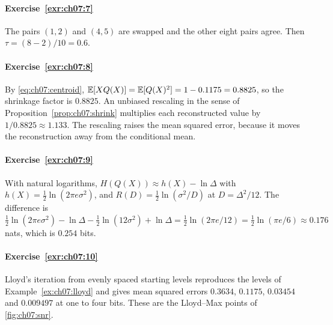 \paragraph{Exercise~\ref{exr:ch07:7}}
The pairs $(1,2)$ and $(4,5)$ are swapped and the other eight pairs agree. Then $\tau=(8-2)/10=0.6$.

\paragraph{Exercise~\ref{exr:ch07:8}}
By \cref{eq:ch07:centroid}, $\mathbb{E}[XQ(X)]=\mathbb{E}[Q(X)^2]=1-0.1175=0.8825$, so the shrinkage factor is $0.8825$. An unbiased rescaling in the sense of Proposition~\ref{prop:ch07:shrink} multiplies each reconstructed value by $1/0.8825\approx1.133$. The rescaling raises the mean squared error, because it moves the reconstruction away from the conditional mean.

\paragraph{Exercise~\ref{exr:ch07:9}}
With natural logarithms, $H(Q(X))\approx h(X)-\ln\Delta$ with $h(X)=\tfrac12\ln(2\pi e\sigma^2)$, and $R(D)=\tfrac12\ln(\sigma^2/D)$ at $D=\Delta^2/12$. The difference is $\tfrac12\ln(2\pi e\sigma^2)-\ln\Delta-\tfrac12\ln(12\sigma^2)+\ln\Delta=\tfrac12\ln(2\pi e/12)=\tfrac12\ln(\pi e/6)\approx0.176$ nats, which is $0.254$ bits.

\paragraph{Exercise~\ref{exr:ch07:10}}
Lloyd's iteration from evenly spaced starting levels reproduces the levels of Example~\ref{ex:ch07:lloyd} and gives mean squared errors $0.3634$, $0.1175$, $0.03454$ and $0.009497$ at one to four bits. These are the Lloyd--Max points of \cref{fig:ch07:snr}.

